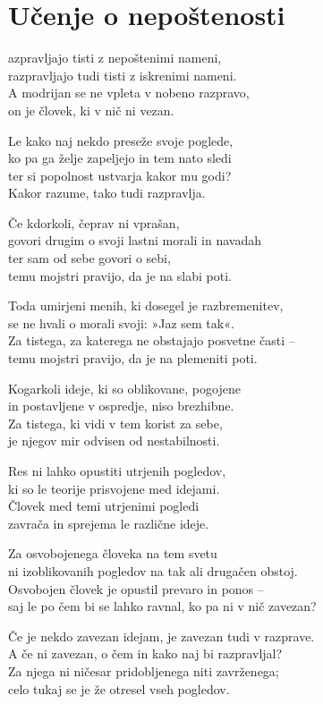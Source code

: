 \cleartorecto
{}
\chapter{Učenje o nepoštenosti}

azpravljajo tisti z nepoštenimi nameni,\\
razpravljajo tudi tisti z iskrenimi nameni.\\
A modrijan se ne vpleta v nobeno razpravo,\\
on je človek, ki v nič ni vezan.

Le kako naj nekdo preseže svoje poglede,\\
ko pa ga želje zapeljejo in tem nato sledi\\
ter si popolnost ustvarja kakor mu godi?\\
Kakor razume, tako tudi razpravlja.

Če kdorkoli, čeprav ni vprašan,\\
govori drugim o svoji lastni morali in navadah\\
ter sam od sebe govori o sebi,\\
temu mojstri pravijo, da je na slabi poti.

Toda umirjeni menih, ki dosegel je razbremenitev,\\
se ne hvali o morali svoji: »Jaz sem tak«.\\
Za tistega, za katerega ne obstajajo posvetne časti --\\
temu mojstri pravijo, da je na plemeniti poti.

\clearpage

Kogarkoli ideje, ki so oblikovane, pogojene\\
in postavljene v ospredje, niso brezhibne.\\
Za tistega, ki vidi v tem korist za sebe,\\
je njegov mir odvisen od nestabilnosti.

Res ni lahko opustiti utrjenih pogledov,\\
ki so le teorije prisvojene med idejami.\\
Človek med temi utrjenimi pogledi\\
zavrača in sprejema le različne ideje.

Za osvobojenega človeka na tem svetu\\
ni izoblikovanih pogledov na tak ali drugačen obstoj.\\
Osvobojen človek je opustil prevaro in ponos --\\
saj le po čem bi se lahko ravnal, ko pa ni v nič zavezan?

Če je nekdo zavezan idejam, je zavezan tudi v razprave.\\
A če ni zavezan, o čem in kako naj bi razpravljal?\\
Za njega ni ničesar pridobljenega niti zavrženega;\\
celo tukaj se je že otresel vseh pogledov.

